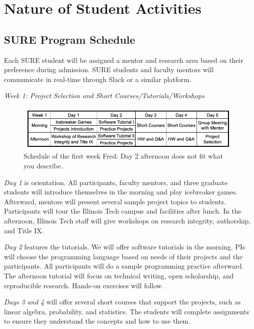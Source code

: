 \documentclass[11pt]{NSFamsart}
\newcommand{\FJHNote}[1]{{\color{blue}Fred: #1}}
\begin{document}
\section{Nature of Student Activities}
\subsection{SURE Program Schedule}
\label{sec:SURESchedule}
Each SURE student will be
assigned a mentor and research area based on their preference during admission. SURE students and faculty
mentors will communicate in real-time through Slack or a similar platform. 



\centerline{\emph{Week 1: Project Selection and Short Courses/Tutorials/Workshops}}
\vspace{-3ex}
\begin{figure}[bh]
    \centering
    \includegraphics[width = 14cm]{FirstWeekSchedule.png}
    \caption{Schedule of the first week \FJHNote{Day 2 afternoon does not fit what you describe.}}
    \label{fig:1stweekschedule}
\end{figure}

\emph{Day 1} is orientation. All participants, faculty mentors, and three graduate students will introduce themselves in the morning and play icebreaker games. Afterward, mentors will present several sample project topics to students.
Participants will tour the Illinois Tech campus and facilities after lunch. In the afternoon, Illinois Tech staff will give workshops on research integrity, authorship, and Title IX.

\emph{Day 2} features the tutorials.
 We will offer software tutorials in the morning. PIs will choose the programming language based on needs of their projects and the participants. All participants will do a sample programming practice afterward. The afternoon tutorial will focus on technical writing, open scholarship, and reproducible research. Hands-on exercises will follow.
 
 \emph{Days 3 and 4} will offer several short courses that support the projects, such as linear algebra, probability, and statistics. The students will complete assignments to ensure they understand the concepts and how to use them.
\end{document}
